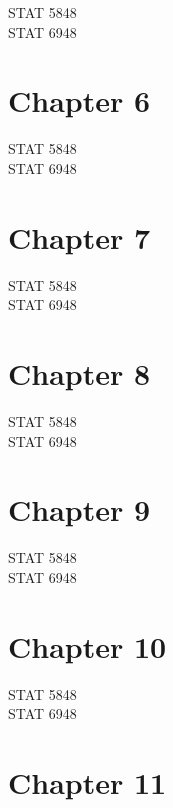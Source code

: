 \documentclass[11pt]{article}
\begin{document}
\begin{description}
\item[STAT 5848] 
\item[STAT 6948] 
\end{description}
\section{Chapter 6}
\label{sec-6}

\begin{description}
\item[STAT 5848] 
\item[STAT 6948] 
\end{description}
\section{Chapter 7}
\label{sec-7}

\begin{description}
\item[STAT 5848] 
\item[STAT 6948] 
\end{description}
\section{Chapter 8}
\label{sec-8}

\begin{description}
\item[STAT 5848] 
\item[STAT 6948] 
\end{description}
\section{Chapter 9}
\label{sec-9}

\begin{description}
\item[STAT 5848] 
\item[STAT 6948] 
\end{description}
\section{Chapter 10}
\label{sec-10}

\begin{description}
\item[STAT 5848] 
\item[STAT 6948] 
\end{description}
\section{Chapter 11}
\label{sec-11}
\end{document}
